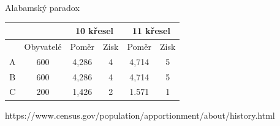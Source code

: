 \documentclass[17pt]{beamer}
\begin{document}
\begin{frame}{Alabamský paradox}
\begin{center}
\begin{tabular}{|c|c|c|c|c|c|}
\hline 
 &  & \multicolumn{2}{c|}{10 křesel} & \multicolumn{2}{c|}{11 křesel} \\ 
\hline 
 & Obyvatelé & Poměr & Zisk & Poměr & Zisk \\ 
\hline 
A & 600 & 4,286 & 4 & 4,714 & 5 \\ 
\hline 
B & 600 & 4,286 & 4 & 4,714 & 5 \\ 
\hline 
C & 200 & 1,426 & 2 & 1.571 & 1 \\ 
\hline
\end{tabular} 
\end{center}
\end{frame}



https://www.census.gov/population/apportionment/about/history.html
\end{document}
